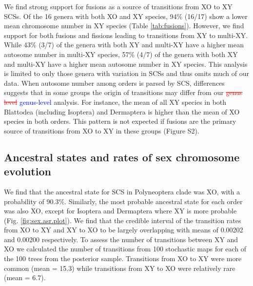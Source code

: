 \documentclass[]{rsos}%
\begin{document}
We find strong support for fusions as a source of transitions from XO to XY SCSs.
Of the 16 genera with both XO and XY species, 94\% (16/17) show a lower mean chromosome number in XY species (Table \ref{tab:fusions}). 
However, we find support for both fusions and fissions leading to transitions from XY to multi-XY.
While 43\% (3/7) of the genera with both XY and multi-XY have a higher mean autosome number in multi-XY species, 57\% (4/7) of the genera with both XY and multi-XY have a higher mean autosome number in XY species.
This analysis is limited to only those genera with variation in SCSs and thus omits much of our data.
When autosome number among orders is parsed by SCS, differences suggests that in some groups the origin of transitions may differ from our
\textcolor{red}{\st{genus level}} \textcolor{blue}{genus-level} analysis.
For instance, the mean of all XY species in both Blattodea (including Isoptera) and Dermaptera is higher than the mean of XO species in both orders.
This pattern is not expected if fusions are the primary source of transitions from XO to XY in these groups (Figure S2).

\subsection{Ancestral states and rates of sex chromosome evolution}

We find that the ancestral state for SCS in Polyneoptera clade was XO, with a probability of 90.3\%.
Similarly, the most probable ancestral state for each order was also XO, except for Isoptera and Dermaptera where XY is more probable (Fig. \ref{fig:sex.asr.plot}).
We find that the credible interval of the transition rates from XO to XY and XY to XO to be largely overlapping with means of 0.00202 and 0.00200 respectively. 
To assess the number of transitions between XY and XO we calculated the number of transitions from 100 stochastic maps for each of the 100 trees from the posterior sample.
Transitions from XO to XY were more common (mean = 15.3) while transitions from XY to XO were relatively rare (mean = 6.7).
\end{document}
